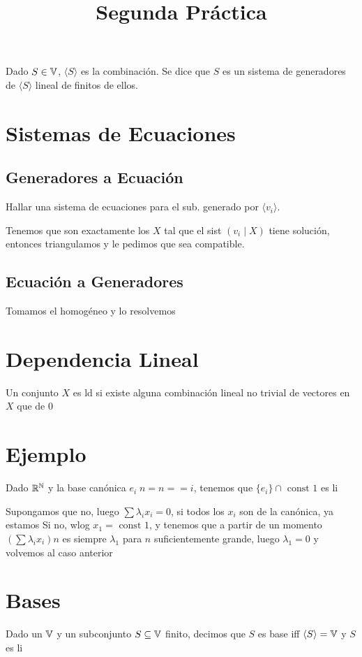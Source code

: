 \documentclass{article}
\title{Segunda Práctica}
\begin{document}
	\maketitle
	Dado $S \in \mathbb{V}$, $\langle S \rangle$ es la combinación.
	Se dice que $S$ es un sistema de generadores de $\langle S \rangle$
	lineal de finitos de ellos.
	\section{Sistemas de Ecuaciones}
	\subsection{Generadores a Ecuación}
	Hallar una sistema de ecuaciones para el sub. generado por $\langle v_i\rangle$.

	Tenemos que son exactamente los $X$ tal que el sist $
	(v_i \mid X)
	$ tiene solución, entonces triangulamos y le pedimos que sea compatible.
	\subsection{Ecuación a Generadores}
	Tomamos el homogéneo y lo resolvemos

	\section{Dependencia Lineal}
	Un conjunto $X$ es ld si existe alguna combinación lineal no trivial de vectores en
	$X$ que de $0$

	\section{Ejemplo}
	Dado $\mathbb{R}^{\mathbb{N}}$ y la base canónica $e_i \; n = n == i$, tenemos que
	$\{e_i\} \cap \text{ const } 1$ es li

	Supongamos que no, luego $\sum \lambda_i x_i = 0$, si todos los $x_i$ son de la
	canónica, ya estamos
	Si no, wlog $x_1 = \text{ const } 1$, y tenemos que a partir de un momento
	$\left(\sum \lambda_i x_i\right) n$
	es siempre $\lambda_1$ para $n$ suficientemente grande,
	luego $\lambda_1 = 0$ y
	volvemos al caso anterior

	\section{Bases}
	Dado un $\mathbb{V}$ y un subconjunto $S \subseteq \mathbb{V}$ finito, decimos que $S$ es base iff
	$\langle S \rangle = \mathbb{V}$ y $S$ es li
\end{document}
